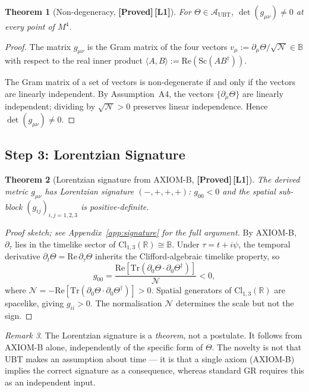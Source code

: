 \documentclass[12pt,a4paper]{article}
\newtheorem{theorem}{Theorem}[section]
\theoremstyle{definition}
\theoremstyle{remark}
\newtheorem{remark}[theorem]{Remark}
\newcommand{\PROVED}{\textbf{[Proved]}}
\newcommand{\Lone}{\textbf{[L1]}}
\newcommand{\BB}{\mathbb{B}}
\newcommand{\RR}{\mathbb{R}}
\newcommand{\Tr}{\mathrm{Tr}}
\newcommand{\re}{\mathrm{Re}}
\newcommand{\calA}{\mathcal{A}}
\newcommand{\calN}{\mathcal{N}}
\begin{document}
\begin{theorem}[Non-degeneracy, \PROVED\,\Lone]
\label{thm:nondeg}
For $\Theta \in \calA_{\mathrm{UBT}}$,
$\det(g_{\mu\nu}) \neq 0$ at every point of $M^4$.
\end{theorem}

\begin{proof}
The matrix $g_{\mu\nu}$ is the Gram matrix of the four vectors
$v_\mu := \partial_\mu\Theta/\sqrt{\calN} \in \BB$
with respect to the real inner product
$\langle A,B\rangle := \re(\mathrm{Sc}(AB^\dagger))$.

The Gram matrix of a set of vectors is non-degenerate if and only if the vectors
are linearly independent.
By Assumption~A4, the vectors $\{\partial_\mu\Theta\}$ are linearly independent;
dividing by $\sqrt{\calN} > 0$ preserves linear independence.
Hence $\det(g_{\mu\nu}) \neq 0$.
\end{proof}

\subsection{Step 3: Lorentzian Signature}
\label{sec:step3}

\begin{theorem}[Lorentzian signature from AXIOM-B, \PROVED\,\Lone]
\label{thm:signature}
The derived metric $g_{\mu\nu}$ has Lorentzian signature $(-,+,+,+)$:
$g_{00} < 0$ and the spatial sub-block $(g_{ij})_{i,j=1,2,3}$ is
positive-definite.
\end{theorem}

\begin{proof}[Proof sketch; see Appendix~\ref{app:signature} for the full argument]
By AXIOM-B, $\partial_\tau$ lies in the timelike sector of
$\mathrm{Cl}_{1,3}(\RR) \cong \BB$.
Under $\tau = t + i\psi$, the temporal derivative
$\partial_t\Theta = \re\,\partial_\tau\Theta$
inherits the Clifford-algebraic timelike property, so
\[
  g_{00}
  = \frac{\re[\Tr(\partial_0\Theta \cdot \partial_0\Theta^\dagger)]}{\calN} < 0,
\]
where $\calN = -\re[\Tr(\partial_0\Theta \cdot \partial_0\Theta^\dagger)] > 0$.
Spatial generators of $\mathrm{Cl}_{1,3}(\RR)$ are spacelike, giving $g_{ii} > 0$.
The normalisation $\calN$ determines the scale but not the sign.
\end{proof}

\begin{remark}
The Lorentzian signature is a \emph{theorem}, not a postulate.
It follows from AXIOM-B alone, independently of the specific form of $\Theta$.
The novelty is not that UBT makes an assumption about time --- it is that a single
axiom (AXIOM-B) implies the correct signature as a consequence, whereas standard
GR requires this as an independent input.
\end{remark}
\end{document}
